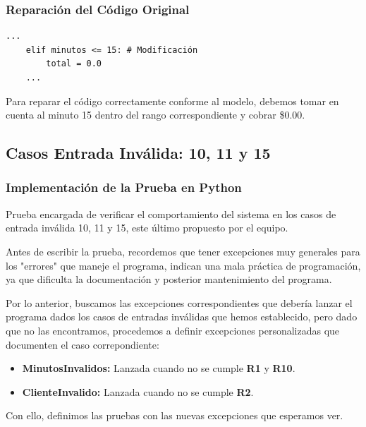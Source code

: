 \documentclass[11pt,letterpaper]{article}
\begin{document}
\subsubsection{Reparación del Código Original}
\label{sec:org48660c4}


\begin{lstlisting}[style=practica]
    ...
    elif minutos <= 15: # Modificación
        total = 0.0
    ...
\end{lstlisting}

Para reparar el código correctamente conforme al modelo, debemos tomar en cuenta al minuto 15 dentro del rango correspondiente y cobrar \$0.00.
\subsection{Casos Entrada Inválida: 10, 11 y 15}
\label{sec:org134b5d6}

\subsubsection{Implementación de la Prueba en Python}
\label{sec:orgb2e0d45}

Prueba encargada de verificar el comportamiento del sistema en los casos de entrada inválida 10, 11 y 15, este último propuesto por el equipo.

\vspace{\baselineskip}

Antes de escribir la prueba, recordemos que tener excepciones muy generales para los "errores" que maneje el programa, indican una mala práctica de programación, ya que dificulta la documentación y posterior mantenimiento del programa.

\vspace{\baselineskip}

Por lo anterior, buscamos las excepciones correspondientes que debería lanzar el programa dados los casos  de entradas inválidas que hemos establecido, pero dado que no las encontramos, procedemos a definir excepciones personalizadas que documenten el caso correpondiente:

\begin{itemize}
\item \textbf{MinutosInvalidos:} Lanzada cuando no se cumple \textbf{R1} y \textbf{R10}.
\item \textbf{ClienteInvalido:} Lanzada cuando no se cumple \textbf{R2}.
\end{itemize}

Con ello, definimos las pruebas con las nuevas excepciones que esperamos ver.
\end{document}
